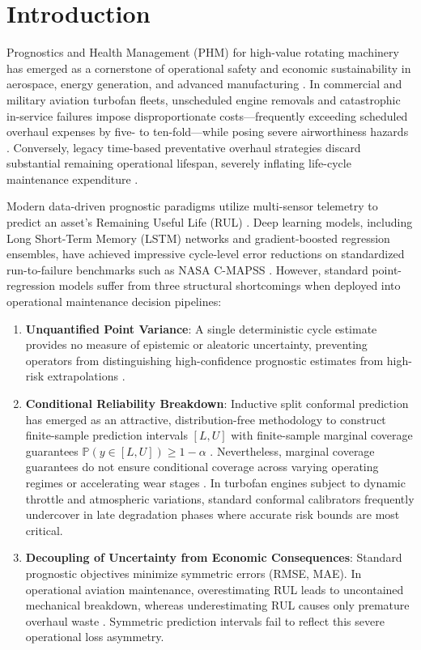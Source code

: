 \documentclass[conference]{IEEEtran}
\begin{document}
\section{Introduction}

Prognostics and Health Management (PHM) for high-value rotating machinery has emerged as a cornerstone of operational safety and economic sustainability in aerospace, energy generation, and advanced manufacturing \cite{saxena2008damage, diana2025ai}. In commercial and military aviation turbofan fleets, unscheduled engine removals and catastrophic in-service failures impose disproportionate costs—frequently exceeding scheduled overhaul expenses by five- to ten-fold—while posing severe airworthiness hazards \cite{shehadeh2024evaluating, hosseinzadeh2023predictive}. Conversely, legacy time-based preventative overhaul strategies discard substantial remaining operational lifespan, severely inflating life-cycle maintenance expenditure \cite{bello2024ai, brighenti2024forecasting}.

Modern data-driven prognostic paradigms utilize multi-sensor telemetry to predict an asset's Remaining Useful Life (RUL) \cite{wu2026research}. Deep learning models, including Long Short-Term Memory (LSTM) networks and gradient-boosted regression ensembles, have achieved impressive cycle-level error reductions on standardized run-to-failure benchmarks such as NASA C-MAPSS \cite{saxena2008damage, diao2026turbofan}. However, standard point-regression models suffer from three structural shortcomings when deployed into operational maintenance decision pipelines:
\begin{enumerate}
    \item \textbf{Unquantified Point Variance}: A single deterministic cycle estimate provides no measure of epistemic or aleatoric uncertainty, preventing operators from distinguishing high-confidence prognostic estimates from high-risk extrapolations \cite{chen2022data, walia2026uncertainty}.
    \item \textbf{Conditional Reliability Breakdown}: Inductive split conformal prediction has emerged as an attractive, distribution-free methodology to construct finite-sample prediction intervals $[L, U]$ with finite-sample marginal coverage guarantees $\mathbb{P}(y \in [L, U]) \ge 1 - \alpha$ \cite{javanmardi2023conformal, diao2026turbofan}. Nevertheless, marginal coverage guarantees do not ensure conditional coverage across varying operating regimes or accelerating wear stages \cite{yang2026empirical, yan2026audit}. In turbofan engines subject to dynamic throttle and atmospheric variations, standard conformal calibrators frequently undercover in late degradation phases where accurate risk bounds are most critical.
    \item \textbf{Decoupling of Uncertainty from Economic Consequences}: Standard prognostic objectives minimize symmetric errors (RMSE, MAE). In operational aviation maintenance, overestimating RUL leads to uncontained mechanical breakdown, whereas underestimating RUL causes only premature overhaul waste \cite{zhu2025predictive, robinson2026riskaware}. Symmetric prediction intervals fail to reflect this severe operational loss asymmetry.
\end{enumerate}
\end{document}
